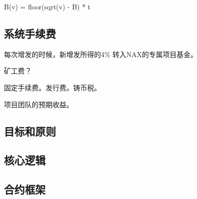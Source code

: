 B(v) =  floor(sqrt(v) - B) * t

\subsection{系统手续费}
每次增发的时候，新增发所得的4\% 转入NAX的专属项目基金。

矿工费？

固定手续费。发行费。铸币税。

项目团队的预期收益。
\subsection{目标和原则}

\subsection{核心逻辑}

\subsection{合约框架}

